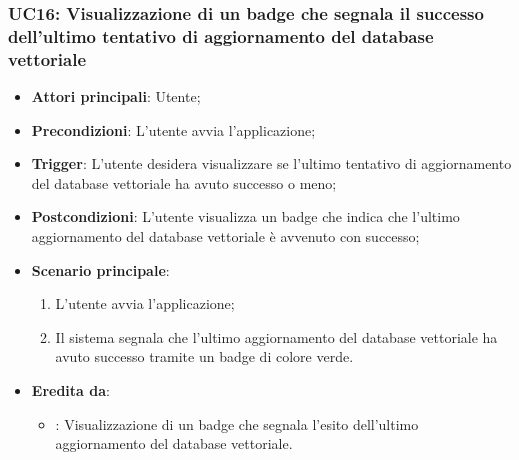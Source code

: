 \hypertarget{UC16}{}
\subsubsection{UC16: Visualizzazione di un badge che segnala il successo dell'ultimo tentativo di aggiornamento del database vettoriale}
\begin{itemize}
    \item \textbf{Attori principali}: Utente;
    \item \textbf{Precondizioni}: L'utente avvia l'applicazione;
    \item \textbf{Trigger}: L'utente desidera visualizzare se l'ultimo tentativo di aggiornamento del database vettoriale
    ha avuto successo o meno;
    \item \textbf{Postcondizioni}: L'utente visualizza un badge che indica che l'ultimo aggiornamento del database vettoriale
    è avvenuto con successo;
    \item \textbf{Scenario principale}:
    \begin{enumerate}
        \item L'utente avvia l'applicazione;
        \item Il sistema segnala che l'ultimo aggiornamento del database vettoriale ha avuto successo tramite un badge di colore verde.
    \end{enumerate}
    \item \textbf{Eredita da}:
    \begin{itemize}
        \item {}: Visualizzazione di un badge che segnala l'esito dell'ultimo aggiornamento del database vettoriale.
    \end{itemize}
\end{itemize}

\hypertarget{UC17}{}
